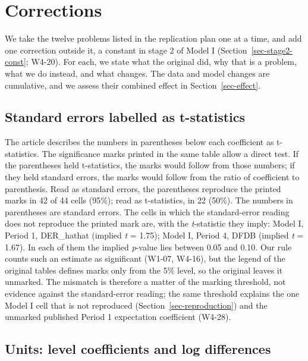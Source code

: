 \documentclass[
  12pt,
  a4paper,
]{article}
\begin{document}
\section{Corrections}\label{sec-corrections}

We take the twelve problems listed in the replication plan one at a
time, and add one correction outside it, a constant in stage 2 of Model
I (Section~\ref{sec-stage2-const}; W4-20). For each, we state what the
original did, why that is a problem, what we do instead, and what
changes. The data and model changes are cumulative, and we assess their
combined effect in Section~\ref{sec-effect}.

\subsection{Standard errors labelled as
t-statistics}\label{standard-errors-labelled-as-t-statistics}

The article describes the numbers in parentheses below each coefficient
as t-statistics. The significance marks printed in the same table allow
a direct test. If the parentheses held t-statistics, the marks would
follow from those numbers; if they held standard errors, the marks would
follow from the ratio of coefficient to parenthesis. Read as standard
errors, the parentheses reproduce the printed marks in 42 of 44 cells
(95\%); read as t-statistics, in 22 (50\%). The numbers in parentheses
are standard errors. The cells in which the standard-error reading does
not reproduce the printed mark are, with the \emph{t}-statistic they
imply: Model I, Period 1, DER\_hathat (implied \emph{t} = 1.75); Model
I, Period 4, DFDB (implied \emph{t} = 1.67). In each of them the implied
\emph{p}-value lies between 0.05 and 0.10. Our rule counts such an
estimate as significant (W1-07, W4-16), but the legend of the original
tables defines marks only from the 5\% level, so the original leaves it
unmarked. The mismatch is therefore a matter of the marking threshold,
not evidence against the standard-error reading; the same threshold
explains the one Model I cell that is not reproduced
(Section~\ref{sec-reproduction}) and the unmarked published Period 1
expectation coefficient (W4-28).

\subsection{Units: level coefficients and log
differences}\label{units-level-coefficients-and-log-differences}
\end{document}
